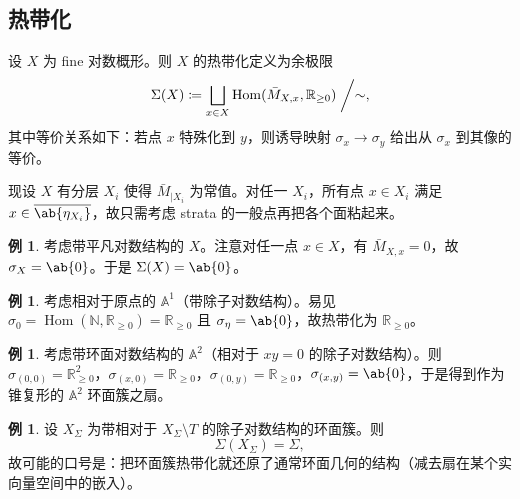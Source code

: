 \documentclass{amsart}
\theoremstyle{definition}
\newtheorem{exm}[thm]{例}
\theoremstyle{remark}
\theoremstyle{plain}
\theoremstyle{definition}
\theoremstyle{remark}
\newcommand{\A}{\mathbb{A}}
\newcommand{\N}{\mathbb{N}}
\newcommand{\R}{\mathbb{R}}
\newcommand{\ol}[1]{\overline{#1}}
\newcommand{\1}{\mathbf{1}}
\newcommand{\2}{\mathbf{2}}
\newcommand{\3}{\mathbf{3}}
\DeclareMathOperator{\Hom}{Hom}
\begin{document}
\subsection{热带化}%
\label{sub:Tropicalization}

设 \(X\) 为 fine 对数概形。则 \(X\) 的热带化定义为余极限
\[\Sigma(X) \coloneqq \bigsqcup_{x \in X} \Hom(\bar{M}_{X,x}, \R_{\geq 0}) \biggm/ \sim, \]
其中等价关系如下：若点 \(x\) 特殊化到 \(y\)，则诱导映射 \(\sigma_x \to \sigma_y\) 给出从 \(\sigma_x\) 到其像的等价。

现设 \(X\) 有分层 \(X_i\) 使得 \(\bar{M}_{|X_i}\) 为常值。对任一 \(X_i\)，所有点 \(x \in X_i\) 满足 \(x \in \ol{\ab\{\eta_{X_i}\}}\)，故只需考虑 strata 的一般点再把各个面粘起来。

\begin{exm}
    考虑带平凡对数结构的 \(X\)。注意对任一点 \(x \in X\)，有 \(\bar{M}_{X,x} = 0\)，故 \(\sigma_X = \ab\{0\}\)。于是 \(\Sigma(X) = \ab\{0\}\)。
\end{exm}

\begin{exm}
    考虑相对于原点的 \(\A^1\)（带除子对数结构）。易见 \(\sigma_0 = \Hom(\N, \R_{\geq 0}) = \R_{\geq 0}\) 且 \(\sigma_{\eta} = \ab\{0\}\)，故热带化为 \(\R_{\geq 0}\)。
\end{exm}

\begin{exm}
    考虑带环面对数结构的 \(\A^2\)（相对于 \(xy = 0\) 的除子对数结构）。则 \(\sigma_{(0,0)} = \R^2_{\geq 0}\)，\(\sigma_{(x,0)} = \R_{\geq 0}\)，\(\sigma_{(0,y)} = \R_{\geq 0}\)，\(\sigma_{(x,y)} = \ab\{0\}\)，于是得到作为锥复形的 \(\A^2\) 环面簇之扇。
\end{exm}

\begin{exm}
    设 \(X_{\Sigma}\) 为带相对于 \(X_{\Sigma} \setminus T\) 的除子对数结构的环面簇。则
    \[ \Sigma(X_{\Sigma}) = \Sigma, \]
    故可能的口号是：把环面簇热带化就还原了通常环面几何的结构（减去扇在某个实向量空间中的嵌入）。
\end{exm}
\end{document}

